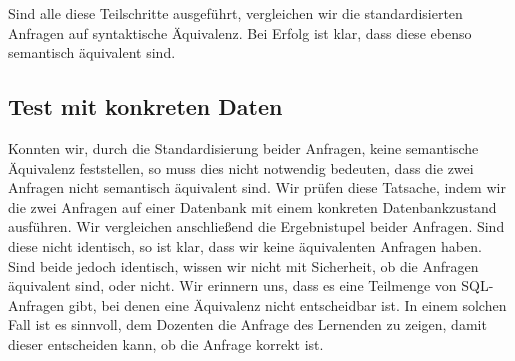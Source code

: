 Sind alle diese Teilschritte ausgeführt, vergleichen wir die standardisierten Anfragen auf syntaktische Äquivalenz. Bei Erfolg ist klar, dass diese ebenso semantisch äquivalent sind.




\subsection{Test mit konkreten Daten}

Konnten wir, durch die Standardisierung beider Anfragen, keine semantische Äquivalenz feststellen, so muss dies nicht notwendig bedeuten, dass die zwei Anfragen nicht semantisch äquivalent sind. Wir prüfen diese Tatsache, indem wir die zwei Anfragen auf einer Datenbank mit einem konkreten Datenbankzustand ausführen. Wir vergleichen anschließend die Ergebnistupel beider Anfragen. Sind diese nicht identisch, so ist klar, dass wir keine äquivalenten Anfragen haben. Sind beide jedoch identisch, wissen wir nicht mit Sicherheit, ob die Anfragen äquivalent sind, oder nicht. Wir erinnern uns, dass es eine Teilmenge von SQL-Anfragen gibt, bei denen eine Äquivalenz nicht entscheidbar ist. In einem solchen Fall ist es sinnvoll, dem Dozenten die Anfrage des Lernenden zu zeigen, damit dieser entscheiden kann, ob die Anfrage korrekt ist.



